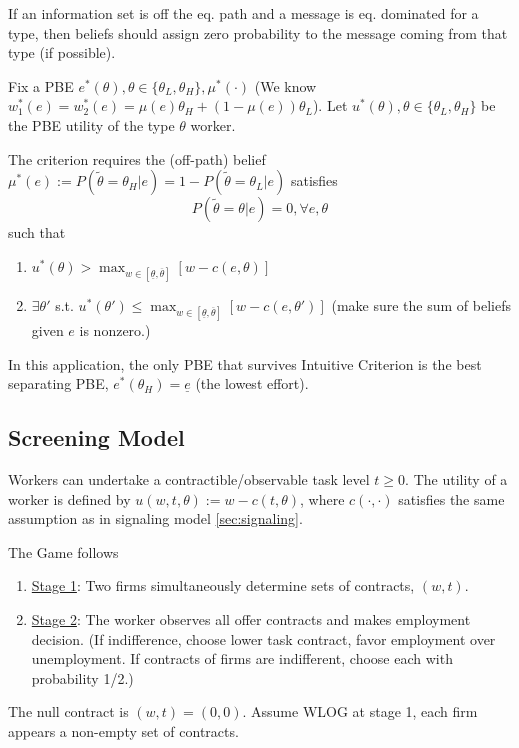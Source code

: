 \documentclass[11pt]{elegantbook}
\begin{document}
\begin{definition}
    \normalfont
    If an information set is off the eq. path and a message is eq. dominated for a type, then beliefs should assign zero probability to the message coming from that type (if possible).
\end{definition}

Fix a PBE $e^*(\theta), \theta\in\{\theta_L,\theta_H\}, \mu^*(\cdot)$ (We know $w_1^*(e)=w_2^*(e)=\mu(e)\theta_H+(1-\mu(e))\theta_L$). Let $u^*(\theta),\theta\in\{\theta_L,\theta_H\}$ be the PBE utility of the type $\theta$ worker.

The criterion requires the (off-path) belief $\mu^*(e):=P(\tilde{\theta}=\theta_H|e)=1-P(\tilde{\theta}=\theta_L|e)$ satisfies $$P(\tilde{\theta}=\theta|e)=0,\forall e,\theta$$ such that
\begin{enumerate}
    \item $u^*(\theta)>\max_{w\in[\underline{\theta},\overline{\theta}]}[w-c(e,\theta)]$
    \item $\exists \theta'$ s.t. $u^*(\theta')\leq \max_{w\in[\underline{\theta},\overline{\theta}]}[w-c(e,\theta')]$ (make sure the sum of beliefs given $e$ is nonzero.)
\end{enumerate}
In this application, the only PBE that survives Intuitive Criterion is the best separating PBE, $e^*(\theta_H)=\underline{e}$ (the lowest effort).


\subsection{Screening Model}
Workers can undertake a contractible/observable task level $t\geq 0$. The utility of a worker is defined by $u(w,t,\theta):=w-c(t,\theta)$, where $c(\cdot,\cdot)$ satisfies the same assumption as in signaling model \ref{sec:signaling}.

The Game follows
\begin{enumerate}[]
    \item \underline{Stage 1}: Two firms simultaneously determine sets of contracts, $(w,t)$.
    \item \underline{Stage 2}: The worker observes all offer contracts and makes employment decision.
    (If indifference, choose lower task contract, favor employment over unemployment. If contracts of firms are indifferent, choose each with probability 1/2.)
\end{enumerate}

The null contract is $(w,t)=(0,0)$. Assume WLOG at stage 1, each firm appears a non-empty set of contracts.
\end{document}

